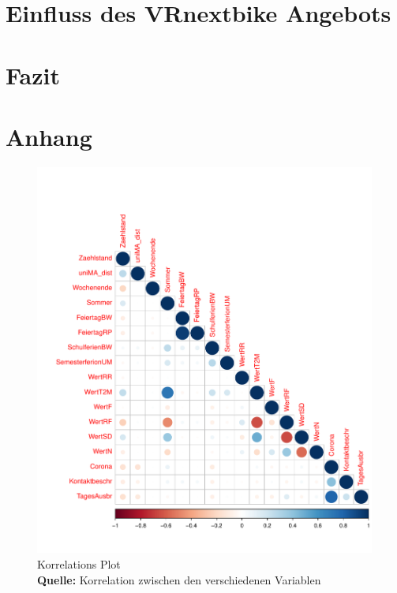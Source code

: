\documentclass[a4paper,12pt]{thesis}
\newcommand*{\captionsource}[2]{%
	\caption[{#1}]{%
		#1%
		\\\hspace{\linewidth}%
		\textbf{Quelle:} #2%
	}%
}
\begin{document}
\chapter{Einfluss des VRnextbike Angebots}

\chapter{Fazit}

\chapter{Anhang}

\begin{figure}[!ht]
	\centering
	\includegraphics[width=\textwidth]{Plots/Corr_Plot.pdf}
	\captionsource{Korrelations Plot}{
		Korrelation zwischen den verschiedenen Variablen
	}
	\label{fig:meine-grafik5}
\end{figure}

\newpage
{}

\end{document}
